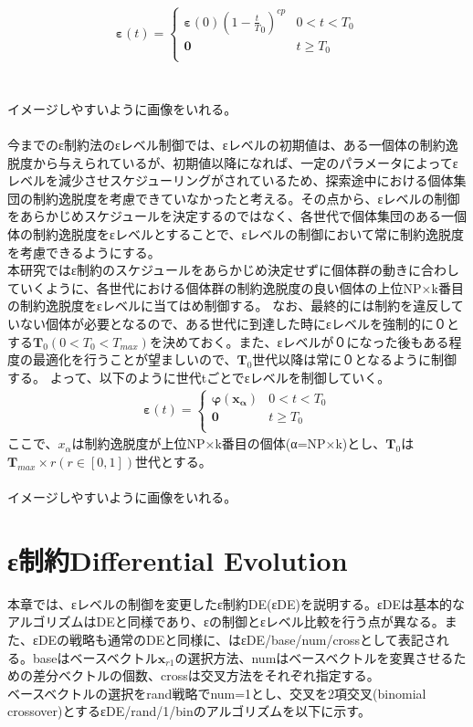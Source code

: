 \documentclass[twocolumn,10pt]{jarticle}
\begin{document}
\begin{eqnarray}
\bm{ε}(t)=
\left\{
\begin{array}{cc}
    \bm{ε}(0){(1-\frac{t}{T}_0)}^{cp} & \mbox{$0<t<{T}_0$} \\
    \bm{0} & \mbox{$t\geq{T}_0$}\\
\end{array}
\right.
\end{eqnarray}
\\
\\
イメージしやすいように画像をいれる。
\\
\\
今までのε制約法のεレベル制御では、εレベルの初期値は、ある一個体の制約逸脱度から与えられているが、初期値以降になれば、一定のパラメータによってεレベルを減少させスケジューリングがされているため、探索途中における個体集団の制約逸脱度を考慮できていなかったと考える。その点から、εレベルの制御をあらかじめスケジュールを決定するのではなく、各世代で個体集団のある一個体の制約逸脱度をεレベルとすることで、εレベルの制御において常に制約逸脱度を考慮できるようにする。
\\

本研究ではε制約のスケジュールをあらかじめ決定せずに個体群の動きに合わしていくように、各世代における個体群の制約逸脱度の良い個体の上位NP×k番目の制約逸脱度をεレベルに当てはめ制御する。
なお、最終的には制約を違反していない個体が必要となるので、ある世代に到達した時にεレベルを強制的に０とする$\bm{T}_0(0<{T}_0<{T}_{max})$を決めておく。また、εレベルが０になった後もある程度の最適化を行うことが望ましいので、$\bm{T}_0$世代以降は常に０となるように制御する。
よって、以下のように世代tごとでεレベルを制御していく。
\begin{eqnarray}
\bm{ε}(t)=
\left\{
\begin{array}{cc}
    \bm{φ({x}_α)} & \mbox{$0<t<{T}_0$} \\
    \bm{0} & \mbox{$t\geq{T}_0$}\\
\end{array}
\right.
\end{eqnarray}
ここで、${x}_α$は制約逸脱度が上位NP×k番目の個体(α=NP×k)とし、$\bm{T}_0$は$\bm{T}_{max}\times{r}(r\in[0,1])$世代とする。
\\
\\
イメージしやすいように画像をいれる。
\\

\section{ε制約Differential Evolution}
本章では、εレベルの制御を変更したε制約DE(εDE)を説明する。εDEは基本的なアルゴリズムはDEと同様であり、εの制御とεレベル比較を行う点が異なる。また、εDEの戦略も通常のDEと同様に、はεDE/base/num/crossとして表記される。baseはベースベクトル$\bm{x}_{r1}$の選択方法、numはベースベクトルを変異させるための差分ベクトルの個数、crossは交叉方法をそれぞれ指定する。\\
ベースベクトルの選択をrand戦略でnum=1とし、交叉を2項交叉(binomial crossover)とするεDE/rand/1/binのアルゴリズムを以下に示す。
\end{document}
